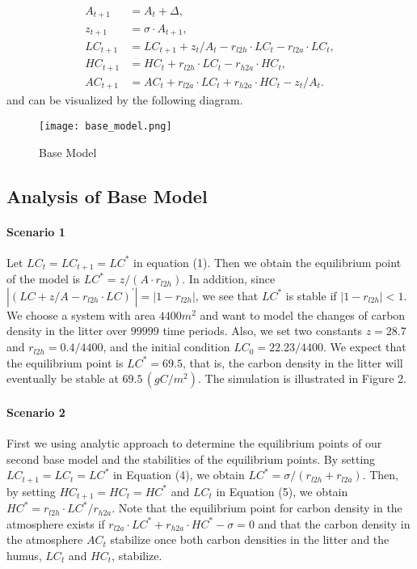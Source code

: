 \documentclass[a4paper]{article}
\begin{document}
\begin{align}
        A_{t+1} &= A_t + \Delta, \\
        z_{t+1} &= \sigma \cdot A_{t+1}, \\
        LC_{t+1} &= LC_{t+1} + z_t/A_t - r_{l2h} \cdot  LC_t - r_{l2a} \cdot LC_t, \\
        HC_{t+1} &= HC_{t} + r_{l2h} \cdot LC_t - r_{h2a} \cdot HC_t, \\
        AC_{t+1} &= AC_t + r_{l2a} \cdot LC_t + r_{h2a} \cdot HC_t - z_t/A_t.
    \end{align} and can be visualized by the following diagram. \begin{figure}[!htp]
        \centering
        \texttt{[image: base\_model.png]}
        \caption{Base Model}
    \end{figure}

\subsection{Analysis of Base Model}

\paragraph{Scenario 1} Let $LC_t = LC_{t+1} = LC^*$ in equation (1). Then we obtain the equilibrium point of the model is $LC^* = z/(A \cdot r_{l2h})$. In addition, since $|(LC + z/A - r_{l2h} \cdot LC)^{\prime}| = |1-r_{l2h}|$, we see that $LC^*$ is stable if $|1-r_{l2h}| < 1$. We choose a system with area $4400 m^2$ and want to model the changes of carbon density in the litter over $99999$ time periods. Also, we set two constants $z = 28.7$ and $r_{l2h} = 0.4/4400$, and the initial condition $LC_0 = 22.23/4400$. We expect that the equilibrium point is $LC^* = 69.5$, that is, the carbon density in the litter will eventually be stable at $69.5 \, (gC/m^2)$. The simulation is illustrated in Figure 2.

\paragraph{Scenario 2} First we using analytic approach to determine the equilibrium points of our second base model and the stabilities of the equilibrium points. By setting $LC_{t+1} = LC_{t} = LC^*$ in Equation (4), we obtain $LC^* = \sigma/(r_{l2h} + r_{l2a})$. Then, by setting $HC_{t+1} = HC_{t} = HC^*$ and $LC_t$ in Equation (5), we obtain $HC^* = r_{l2h} \cdot LC^* / r_{h2a}$. Note that the equilibrium point for carbon density in the atmosphere exists if $r_{l2a} \cdot LC^* + r_{h2a} \cdot HC^* - \sigma = 0$ and that the carbon density in the atmosphere $AC_t$ stabilize once both carbon densities in the litter and the humus, $LC_t$ and $HC_t$, stabilize. 
\end{document}
